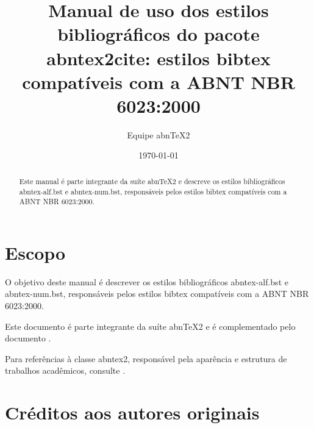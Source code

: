 \documentclass[a4paper]{ltxdoc}
\newcommand{\abnTeX}{abn\TeX}
\begin{document}
\nocite{ABNT-final}

\newcommand{\titulo}{Manual de uso dos estilos bibliográficos do pacote
\textsf{abntex2cite}: estilos \textsf{bibtex} compatíveis com a ABNT NBR
6023:2000}

\author{Equipe abnTeX2}
\title{\titulo}
\date{\today}


% 

\maketitle

\begin{abstract}
Este manual é parte integrante da suíte \abnTeX2 e descreve os estilos
bibliográficos \textsf{abntex-alf.bst} e \textsf{abntex-num.bst}, responsáveis
pelos estilos \textsf{bibtex} compatíveis com a ABNT NBR 6023:2000.
\end{abstract}


\tableofcontents
\listoftables

\section{Escopo}

O objetivo deste manual é descrever os estilos bibliográficos
\textsf{abntex-alf.bst} e \textsf{abntex-num.bst}, responsáveis pelos estilos
\textsf{bibtex} compatíveis com a ABNT NBR 6023:2000. 

Este documento é parte integrante da suíte \abnTeX2 e é complementado pelo
documento .

Para referências à classe \textsf{abntex2}, responsável pela aparência e
estrutura de trabalhos acadêmicos, consulte .

\section{Créditos aos autores originais}
\end{document}
